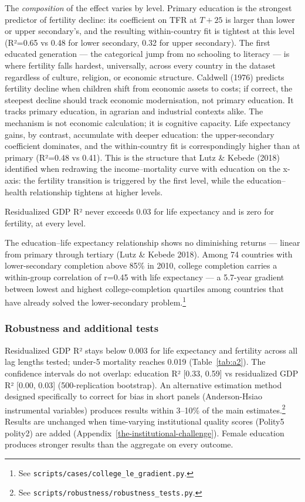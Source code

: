 \documentclass[12pt,letterpaper]{article}
\begin{document}
The \emph{composition} of the
effect varies by level. Primary education is the strongest predictor
of fertility decline: its coefficient on TFR at $T+25$ is larger than
lower or upper secondary's, and the resulting within-country fit is
tightest at this level (R²=0.65 vs 0.48 for lower secondary, 0.32 for
upper secondary). The first educated generation --- the categorical
jump from no schooling to literacy --- is where fertility falls
hardest, universally, across every country in the
dataset regardless of culture, religion, or economic structure.
Caldwell (1976) predicts fertility decline when children shift from economic
assets to costs; if correct, the steepest decline should track economic
modernisation, not primary education. It tracks primary education, in
agrarian and industrial contexts alike. The mechanism is not economic
calculation; it is cognitive capacity.
Life expectancy gains, by contrast, accumulate with deeper education:
the upper-secondary coefficient dominates, and the within-country fit
is correspondingly higher than at primary (R²=0.48 vs 0.41). This
is the structure that Lutz \& Kebede (2018) identified when redrawing
the income--mortality curve with education on the x-axis: the fertility
transition is triggered by the first level, while the education--health
relationship tightens at higher levels.

Residualized GDP R² never exceeds 0.03 for life
expectancy and is zero for fertility, at every level.

The education--life expectancy relationship shows no diminishing returns ---
linear from primary through
tertiary (Lutz \& Kebede 2018). Among 74 countries with lower-secondary
completion above 85\% in 2010, college completion carries a within-group
correlation of r=0.45 with life expectancy --- a 5.7-year gradient
between lowest and highest college-completion quartiles among countries
that have already solved the lower-secondary problem.\footnote{See
\texttt{scripts/cases/college\_le\_gradient.py}.}

\subsubsection*{Robustness and additional tests}

Residualized GDP R² stays below 0.003 for life expectancy and fertility
across all lag lengths tested; under-5 mortality reaches 0.019
(Table~\ref{tab:a2}). The confidence intervals do not overlap: education R²
[0.33, 0.59] vs residualized GDP R² [0.00, 0.03] (500-replication
bootstrap). An alternative estimation method designed
specifically to correct for bias in short panels (Anderson-Hsiao
instrumental variables) produces results within 3--10\% of the main
estimates.\footnote{See \texttt{scripts/robustness/robustness\_tests.py}.} Results are unchanged when time-varying institutional quality scores (Polity5 polity2) are added (Appendix~\ref{the-institutional-challenge}). Female
education produces stronger results than the aggregate on every outcome.
\end{document}
